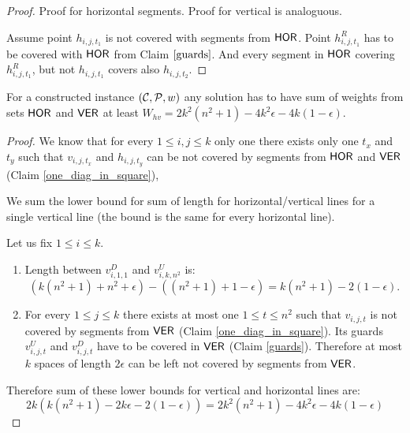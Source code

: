 \begin{proof}
Proof for horizontal segments. Proof for vertical is analoguous.

Assume point $h_{i, j, t_1}$ is not covered with
segments from $\mathsf{HOR}$.
Point $h^R_{i, j, t_1}$ has to be covered with $\mathsf{HOR}$
from Claim $\ref{guards}$.
And every segment in $\mathsf{HOR}$ covering $h^R_{i, j, t_1}$,
but not $h_{i,j,t_1}$ covers also $h_{i, j, t_2}$.
\end{proof}

\begin{lemma}
\label{vertical_horizontal_sum}
For a constructed instance $(\mathcal{C}, \mathcal{P}, w)$
any solution has to have sum of weights from sets $\mathsf{HOR}$ and $\mathsf{VER}$ at least
$W_{hv} = 2k^2(n^2+1) -4k^2\epsilon -4k(1-\epsilon)$.
\end{lemma}

\begin{proof}
We know that for every $1 \le i,j \le k$
only one there exists only one $t_x$ and $t_y$ such that
$v_{i,j,t_x}$ and $h_{i,j,t_y}$
can be not covered by
segments from $\mathsf{HOR}$ and $\mathsf{VER}$ (Claim \ref{one_diag_in_square}),


We sum the lower bound for sum of length for horizontal/vertical
lines for a single vertical line
(the bound is the same for every horizontal line).

Let us fix $1 \le i \le k$.

\begin{enumerate}[label={(\arabic*)}]
\item Length between $v^D_{i, 1, 1}$ and $v^U_{i, k, n^2}$ is:
$$(k(n^2+1) + n^2 +\epsilon) - ((n^2+1)+1 -\epsilon) = k(n^2+1) - 2(1 - \epsilon).$$

\item For every $1 \le j \le k$ there exists at most one $1 \le t \le n^2$
such that $v_{i,j,t}$ is not covered by segments from $\mathsf{VER}$
(Claim \ref{one_diag_in_square}).
Its guards $v^U_{i,j,t}$ and $v^D_{i,j,t}$
have to be covered in $\mathsf{VER}$ (Claim \ref{guards}).
Therefore at most $k$ spaces of length $2\epsilon$ can be left
not covered by segments from $\mathsf{VER}$.

\end{enumerate}
Therefore sum of these lower bounds for vertical and horizontal lines are:
$$2k(k(n^2+1) -2k\epsilon -2(1-\epsilon)) = 2k^2(n^2+1) -4k^2\epsilon -4k(1-\epsilon)$$
\end{proof}

